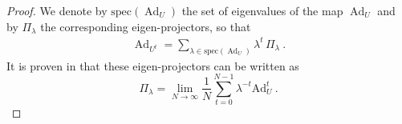 \documentclass[11pt, twocolumn, floatfix, superscriptaddress, aps, prb, raggedbottom]{revtex4-2}
\newcommand\lluis[1]{\textcolor{brown}{#1}}
\newcommand{\comm}{\mathrm{Comm}}
\DeclareMathOperator{\Ad}{Ad}
\begin{document}
\begin{proof}

We denote by $\mathrm{spec}(\Ad_U)$ the set of eigenvalues of the map $\Ad_U$ and by $\Pi_\lambda$ the corresponding eigen-projectors, so that 
\begin{align}\label{eq:spec decomp}
  \Ad_{U^t} = \!\!\sum_{\lambda\in \mathrm{spec}(\Ad_U)}\!\!\!\! 
  \lambda^t\, \Pi_\lambda\ .
\end{align}
It is proven in \cite{Yosida1965} that these eigen-projectors can be written as
\begin{equation}
    \Pi_{\lambda} = \lim_{N\rightarrow \infty} \frac{1}{N} \sum_{t=0}^{N-1}\lambda^{-t}\mathrm{Ad}_U^t\ .
    \label{eq:projector}
\end{equation}

\end{proof}
\end{document}
